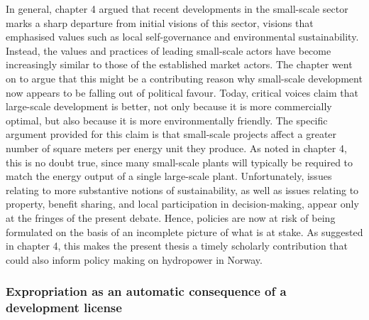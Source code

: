 In general, chapter 4 argued that recent developments in the small-scale sector marks a sharp departure from initial visions of this sector, visions that emphasised values such as local self-governance and environmental sustainability. Instead, the values and practices of leading small-scale actors have become increasingly similar to those of the established market actors. The chapter went on to argue that this might be a contributing reason why small-scale development now appears to be falling out of political favour. Today, critical voices claim that large-scale development is better, not only because it is more commercially optimal, but also because it is more environmentally friendly. The specific argument provided for this claim is that small-scale projects affect a greater number of square meters per energy unit they produce. As noted in chapter 4, this is no doubt true, since many small-scale plants will typically be required to match the energy output of a single large-scale plant. Unfortunately, issues relating to more substantive notions of sustainability, as well as issues relating to property, benefit sharing, and local participation in decision-making, appear only at the fringes of the present debate. Hence, policies are now at risk of being formulated on the basis of an incomplete picture of what is at stake. As suggested in chapter 4, this makes the present thesis a timely scholarly contribution that could also inform policy making on hydropower in Norway.

\subsubsection*{Expropriation as an automatic consequence of a development license}

